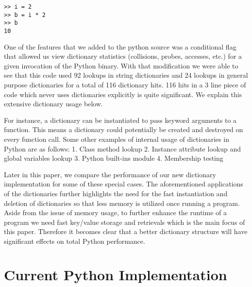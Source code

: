 \documentclass[11pt]{article}
\begin{document}
\begin{verbatim}
>> i = 2 
>> b = i * 2
>> b
10
\end{verbatim}




One of the features that we added to the python source was a conditional flag that allowed us view dictionary statistics (collisions, probes, accesses, etc.) for a given invocation of the Python binary.  With that modification we were able to see that this code used 92 lookups in string dictionaries and 24 lookups in general purpose dictionaries for a total of 116 dictionary hits. 116 hits in a 3 line piece of code which never uses dictionaries explicitly is quite significant.  We explain this extensive dictionary usage below.




For instance, a dictionary can be instantiated to pass keyword arguments to a function. This means a dictionary could potentially be created and destroyed on every function call.  Some other examples of internal usage of dictionaries in Python are as follows:
1. Class method lookup
2. Instance attribute lookup and global variables lookup
3. Python built-ins module
4. Membership testing




Later in this paper, we compare the performance of our new dictionary implementation for some of these special cases. The aforementioned applications of the dictionaries further highlights the need for the fast instantiation and deletion of dictionaries so that less memory is utilized once running a program. Aside from the issue of memory usage, to further enhance the runtime of a program we need fast key/value storage and retrievals which is the main focus of this paper. Therefore it becomes clear that a better dictionary structure will have significant effects on total Python performance.




\section{Current Python Implementation}
\end{document}
